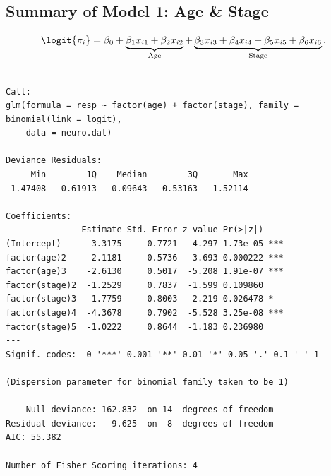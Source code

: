 \documentclass{article}\usepackage[]{graphicx}\usepackage[svgnames]{xcolor}
\makeatletter
\newenvironment{kframe}{%
 \def\at@end@of@kframe{}%
 \ifinner\ifhmode%
  \def\at@end@of@kframe{\end{minipage}}%
  \begin{minipage}{\columnwidth}%
 \fi\fi%
 \def\FrameCommand##1{\hskip\@totalleftmargin \hskip-\fboxsep
 \colorbox{shadecolor}{##1}\hskip-\fboxsep
     \hskip-\linewidth \hskip-\@totalleftmargin \hskip\columnwidth}%
 \MakeFramed {\advance\hsize-\width
   \@totalleftmargin\z@ \linewidth\hsize
   \@setminipage}}%
 {\par\unskip\endMakeFramed%
 \at@end@of@kframe}
\newenvironment{knitrout}{}{} %
\makeatother
\begin{document}
\subsection*{Summary of Model 1: Age \& Stage}
\[ \logit{\pi_i}=\beta_0+\underbrace{\beta_1x_{i1}+\beta_2x_{i2}}_{\text{Age}}+\underbrace{\beta_3x_{i3}+\beta_4x_{i4}+\beta_5x_{i5}+\beta_6x_{i6}}_{\text{Stage}}. \]
\begin{knitrout}
\color{fgcolor}\begin{kframe}
\begin{verbatim}

Call:
glm(formula = resp ~ factor(age) + factor(stage), family = binomial(link = logit), 
    data = neuro.dat)

Deviance Residuals: 
     Min        1Q    Median        3Q       Max  
-1.47408  -0.61913  -0.09643   0.53163   1.52114  

Coefficients:
               Estimate Std. Error z value Pr(>|z|)    
(Intercept)      3.3175     0.7721   4.297 1.73e-05 ***
factor(age)2    -2.1181     0.5736  -3.693 0.000222 ***
factor(age)3    -2.6130     0.5017  -5.208 1.91e-07 ***
factor(stage)2  -1.2529     0.7837  -1.599 0.109860    
factor(stage)3  -1.7759     0.8003  -2.219 0.026478 *  
factor(stage)4  -4.3678     0.7902  -5.528 3.25e-08 ***
factor(stage)5  -1.0222     0.8644  -1.183 0.236980    
---
Signif. codes:  0 '***' 0.001 '**' 0.01 '*' 0.05 '.' 0.1 ' ' 1

(Dispersion parameter for binomial family taken to be 1)

    Null deviance: 162.832  on 14  degrees of freedom
Residual deviance:   9.625  on  8  degrees of freedom
AIC: 55.382

Number of Fisher Scoring iterations: 4
\end{verbatim}
\end{kframe}
\end{knitrout}
\end{document}
